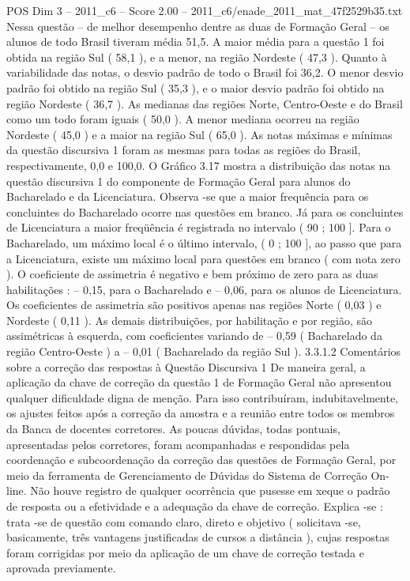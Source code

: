 \begin{textsample}{POS Dim 3 – 2011\_c6 – Score 2.00 – 2011\_c6/enade\_2011\_mat\_47f2529b35.txt}
Nessa questão – de melhor desempenho dentre as duas de Formação Geral – os alunos de todo Brasil tiveram média 51,5.
A maior média para a questão 1 foi obtida na região Sul ( 58,1 ), e a menor, na região Nordeste ( 47,3 ).
Quanto à variabilidade das notas, o desvio padrão de todo o Brasil foi 36,2.
O menor desvio padrão foi obtido na região Sul ( 35,3 ), e o maior desvio padrão foi obtido na região Nordeste ( 36,7 ).
As medianas das regiões Norte, Centro-Oeste e do Brasil como um todo foram iguais ( 50,0 ).
A menor mediana ocorreu na região Nordeste ( 45,0 ) e a maior na região Sul ( 65,0 ).
As notas máximas e mínimas da questão discursiva 1 foram as mesmas para todas as regiões do Brasil, respectivamente, 0,0 e 100,0.
O Gráfico 3.17 mostra a distribuição das notas na questão discursiva 1 do componente de Formação Geral para alunos do Bacharelado e da Licenciatura.
Observa -se que a maior frequência para os concluintes do Bacharelado ocorre nas questões em branco.
Já para os concluintes de Licenciatura a maior freqüência é registrada no intervalo ( 90 ; 100 ].
Para o Bacharelado, um máximo local é o último intervalo, ( 0 ; 100 ], ao passo que para a Licenciatura, existe um máximo local para questões em branco ( com nota zero ).
O coeficiente de assimetria é negativo e bem próximo de zero para as duas habilitações : – 0,15, para o Bacharelado e – 0,06, para os alunos de Licenciatura.
Os coeficientes de assimetria são positivos apenas nas regiões Norte ( 0,03 ) e Nordeste ( 0,11 ).
As demais distribuições, por habilitação e por região, são assimétricas à esquerda, com coeficientes variando de – 0,59 ( Bacharelado da região Centro-Oeste ) a – 0,01 ( Bacharelado da região Sul ). 3.3.1.2 Comentários sobre a correção das respostas à Questão Discursiva 1 De maneira geral, a aplicação da chave de correção da questão 1 de Formação Geral não apresentou qualquer dificuldade digna de menção.
Para isso contribuíram, indubitavelmente, os ajustes feitos após a correção da amostra e a reunião entre todos os membros da Banca de docentes corretores.
As poucas dúvidas, todas pontuais, apresentadas pelos corretores, foram acompanhadas e respondidas pela coordenação e subcoordenação da correção das questões de Formação Geral, por meio da ferramenta de Gerenciamento de Dúvidas do Sistema de Correção On-line.
Não houve registro de qualquer ocorrência que pusesse em xeque o padrão de resposta ou a efetividade e a adequação da chave de correção.
Explica -se : trata -se de questão com comando claro, direto e objetivo ( solicitava -se, basicamente, três vantagens justificadas de cursos a distância ), cujas respostas foram corrigidas por meio da aplicação de um chave de correção testada e aprovada previamente.

\end{textsample}

